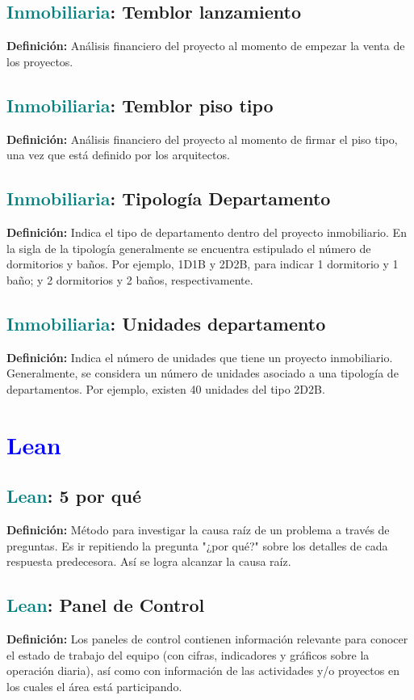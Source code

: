 \documentclass[12pt]{article}
\begin{document}
\subsection{\textcolor{teal}{Inmobiliaria}: Temblor lanzamiento}
\textbf{Definición:} Análisis financiero del proyecto al momento de empezar la venta de los proyectos.
\subsection{\textcolor{teal}{Inmobiliaria}: Temblor piso tipo}
\textbf{Definición:} Análisis financiero del proyecto al momento de firmar el piso tipo, una vez que está definido por los arquitectos.
\subsection{\textcolor{teal}{Inmobiliaria}: Tipología Departamento}
\textbf{Definición:} Indica el tipo de departamento dentro del proyecto inmobiliario. En la sigla de la tipología generalmente se encuentra estipulado el número de dormitorios y baños. Por ejemplo, 1D1B y 2D2B, para indicar 1 dormitorio y 1 baño; y 2 dormitorios y 2 baños, respectivamente.
\subsection{\textcolor{teal}{Inmobiliaria}: Unidades departamento}
\textbf{Definición:} Indica el número de unidades que tiene un proyecto inmobiliario. Generalmente, se considera un número de unidades asociado a una tipología de departamentos. Por ejemplo, existen 40 unidades del tipo 2D2B.
\section{\textcolor{blue}{Lean}}
\subsection{\textcolor{teal}{Lean}:  5 por qué}
\textbf{Definición:} Método para investigar la causa raíz de un problema a través de preguntas. Es ir repitiendo la pregunta "¿por qué?" sobre los detalles de cada respuesta predecesora. Así se logra alcanzar la causa raíz.
\subsection{\textcolor{teal}{Lean}: Panel de Control}
\textbf{Definición:} Los paneles de control contienen información relevante para conocer el estado de trabajo del equipo (con cifras, indicadores y gráficos sobre la operación diaria), así como con información de las actividades y/o proyectos en los cuales el área está participando.
\end{document}
